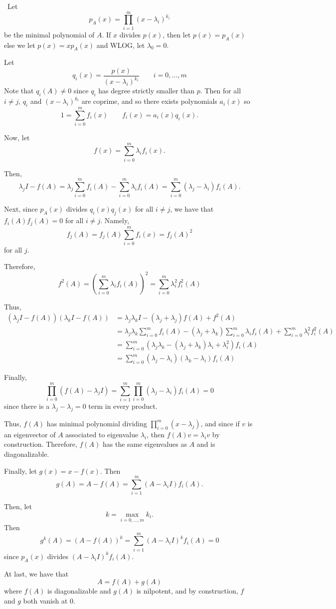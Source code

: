 \documentclass[12pt]{AlgebraQual}
\begin{document}
\begin{solution}$\,$
Let $$p_A(x)=\prod_{i=1}^m(x-\lambda_i)^{k_i}$$ be the minimal polynomial of $A$. If $x$ divides $p(x)$, then let $p(x)=p_A(x)$ else we let $p(x)=xp_A(x)$ and WLOG, let $\lambda_0=0$.

Let $$q_i(x)=\frac{p(x)}{(x-\lambda_i)^{k_i}}\qquad i=0,...,m$$ Note that $q_i(A)\not=0$ since $q_i$ has degree strictly smaller than $p$. Then for all $i\not=j$, $q_i$ and $(x-\lambda_i)^{k_i}$ are coprime, and so there exists polynomials $a_i(x)$ so $$1=\sum_{i=0}^mf_i(x)\qquad f_i(x)=a_i(x)q_i(x).$$

Now, let $$f(x)=\sum_{i=0}^m\lambda_if_i(x).$$

Then, $$\lambda_jI-f(A)=\lambda_j\sum_{i=0}^mf_i(A)-\sum_{i=0}^m\lambda_if_i(A)=\sum_{i=0}^m(\lambda_j-\lambda_i)f_i(A).$$

Next, since $p_A(x)$ divides $q_i(x)q_j(x)$ for all $i\not=j$, we have that $f_i(A)f_j(A)=0$ for all $i\not=j$. Namely, $$f_j(A)=f_j(A)\sum_{i=0}^mf_i(x)=f_j(A)^2$$ for all $j$.

Therefore, $$f^2(A)=\left(\sum_{i=0}^m\lambda_if_i(A)\right)^2=\sum_{i=0}^m\lambda_i^2f_i^2(A)$$

Thus, \begin{align*}
    (\lambda_jI-f(A))(\lambda_kI-f(A))&=\lambda_j\lambda_kI-(\lambda_j+\lambda_j)f(A)+f^2(A)\\
    &=\lambda_j\lambda_k\sum_{i=0}^mf_i(A)-(\lambda_j+\lambda_k)\sum_{i=0}^m\lambda_if_i(A)+\sum_{i=0}^m\lambda_i^2f_i^2(A)\\
    &=\sum_{i=0}^m(\lambda_j\lambda_k-(\lambda_j+\lambda_k)\lambda_i+\lambda_i^2)f_i(A)\\
    &=\sum_{i=0}^m(\lambda_j-\lambda_i)(\lambda_k-\lambda_i)f_i(A)
\end{align*}

Finally, $$\prod_{i=0}^m(f(A)-\lambda_jI)=\sum_{i=1}^m\prod_{i=0}^m(\lambda_j-\lambda_i)f_i(A)=0$$ since there is a $\lambda_j-\lambda_j=0$ term in every product.

Thus, $f(A)$ has minimal polynomial dividing $\prod_{i=0}^m(x-\lambda_j)$, and since if $v$ is an eigenvector of $A$ associated to eigenvalue $\lambda_i$, then $f(A)v=\lambda_iv$ by construction. Therefore, $f(A)$ has the same eigenvalues as $A$ and is diagonalizable.

Finally, let $g(x)=x-f(x)$. Then $$g(A)=A-f(A)=\sum_{i=1}^m(A-\lambda_iI)f_i(A).$$

Then, let $$k=\max_{i=0,...,m}k_i.$$ Then $$g^k(A)=(A-f(A))^k=\sum_{i=1}^m(A-\lambda_iI)^kf_i(A)=0$$ since $p_A(x)$ divides $(A-\lambda_iI)^kf_i(A)$.

At last, we have that $$A=f(A)+g(A)$$ where $f(A)$ is diagonalizable and $g(A)$ is nilpotent, and by construction, $f$ and $g$ both vanish at $0.$
\end{solution}
\newpage
\end{document}
